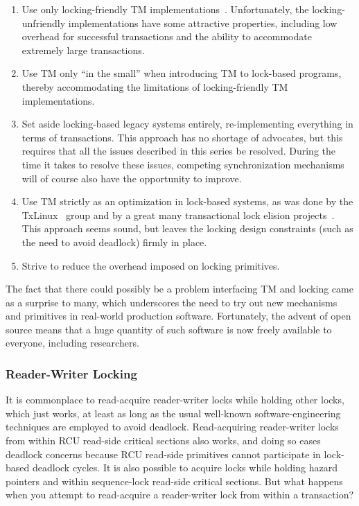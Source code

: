\begin{enumerate}
\item	Use only locking-friendly TM implementations~\cite{DaveDice2006DISC}.
	Unfortunately, the locking-unfriendly implementations have some
	attractive properties, including low overhead for successful
	transactions and the ability to accommodate extremely large
	transactions.
\item	Use TM only ``in the small'' when introducing TM to lock-based
	programs, thereby accommodating the limitations of
	locking-friendly TM implementations.
\item	Set aside locking-based legacy systems entirely, re-implementing
	everything in terms of transactions.
	This approach has no shortage of advocates, but this requires
	that all the issues described in this series be resolved.
	During the time it takes to resolve these issues, competing
	synchronization mechanisms will of course also have the
	opportunity to improve.
\item	Use TM strictly as an optimization in lock-based systems, as was
	done by the TxLinux~\cite{ChistopherJRossbach2007a} group and
	by a great many transactional lock elision
	projects~\cite{MartinPohlack2011HTM2TLE,Kleen:2014:SEL:2566590.2576793,PascalFelber2016rwlockElision,SeongJaePark2020HTMRCUlock}.
	This approach seems sound, but leaves the locking design
	constraints (such as the need to avoid deadlock) firmly in place.
\item	Strive to reduce the overhead imposed on locking primitives.
\end{enumerate}

The fact that there could possibly be a problem interfacing TM and locking
came as a surprise to many, which underscores the need to try out new
mechanisms and primitives in real-world production software.
Fortunately, the advent of open source means that a huge quantity of
such software is now freely available to everyone, including researchers.

\subsubsection{Reader-Writer Locking}
\label{sec:future:Reader-Writer Locking}

It is commonplace to read-acquire reader-writer locks while holding
other locks, which just works, at least as long as the usual well-known
software-engineering techniques are employed to avoid deadlock.
Read-acquiring reader-writer locks from within RCU read-side critical
sections also works, and doing so eases deadlock concerns because RCU
read-side primitives cannot participate in lock-based deadlock cycles.
It is also possible to acquire locks while holding hazard pointers and
within sequence-lock read-side critical sections.
But what happens when you attempt to read-acquire a reader-writer lock
from within a transaction?


